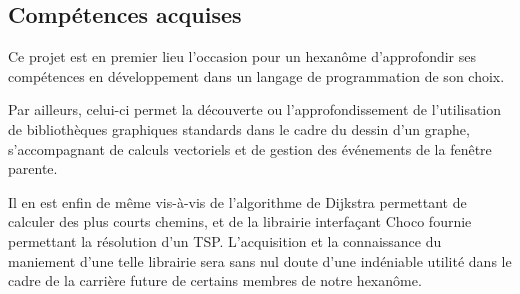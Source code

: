\subsection{Compétences acquises}
Ce projet est en premier lieu l'occasion pour un hexanôme d'approfondir ses compétences en développement dans un langage de programmation de son choix.

Par ailleurs, celui-ci permet la découverte ou l'approfondissement de l'utilisation de bibliothèques graphiques standards dans le cadre du dessin d'un graphe, s'accompagnant de calculs vectoriels et de gestion des événements de la fenêtre parente.

Il en est enfin de même vis-à-vis de l'algorithme de Dijkstra permettant de calculer des plus courts chemins, et de la librairie interfaçant Choco fournie permettant la résolution d'un TSP. L'acquisition et la connaissance du maniement d'une telle librairie sera sans nul doute d'une indéniable utilité dans le cadre de la carrière future de certains membres de notre hexanôme.
\clearpage
